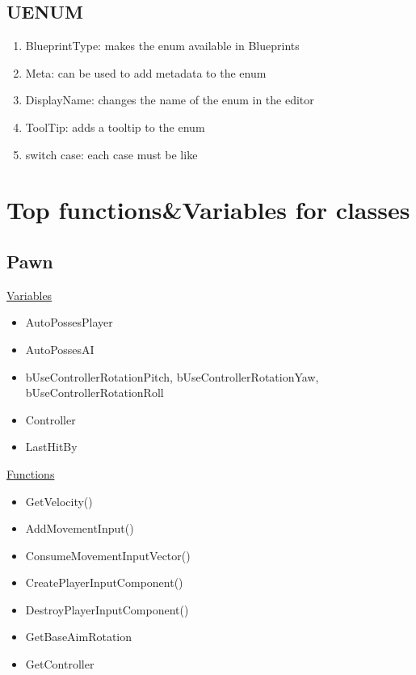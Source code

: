         \subsection{UENUM}
            \begin{enumerate}
                \item BlueprintType: makes the enum available in Blueprints
                \item Meta: can be used to add metadata to the enum
                \item DisplayName: changes the name of the enum in the editor
                \item ToolTip: adds a tooltip to the enum
                \item switch case: each case must be like 
            \end{enumerate}

    \section{Top functions\&Variables for classes}
        \subsection{Pawn}
            \uline{Variables}
            \begin{itemize}
                \item AutoPossesPlayer
                \item AutoPossesAI
                \item bUseControllerRotationPitch, bUseControllerRotationYaw, bUseControllerRotationRoll
                \item Controller
                \item LastHitBy
            \end{itemize}
\smallskip
            \uline{Functions}
            \begin{itemize}
                \item GetVelocity()
                \item AddMovementInput()
                \item ConsumeMovementInputVector()
                \item CreatePlayerInputComponent()
                \item DestroyPlayerInputComponent()
                \item GetBaseAimRotation
                \item GetController
            \end{itemize}
\smallskip


